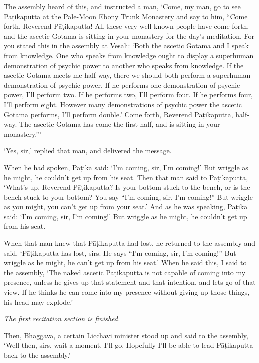\documentclass[12pt,openany]{book}%
\newcommand*{\scendsection}[1]{\begin{center}\textit{#1}\end{center}}
\begin{document}
The assembly heard of this, and instructed a man, ‘Come, my man, go to see \textsanskrit{Pāṭikaputta} at the Pale-Moon Ebony Trunk Monastery and say to him, “Come forth, Reverend \textsanskrit{Pāṭikaputta}! All these very well-known people have come forth, and the ascetic Gotama is sitting in your monastery for the day’s meditation. For you stated this in the assembly at \textsanskrit{Vesālī}: ‘Both the ascetic Gotama and I speak from knowledge. One who speaks from knowledge ought to display a superhuman demonstration of psychic power to another who speaks from knowledge. If the ascetic Gotama meets me half-way, there we should both perform a superhuman demonstration of psychic power. If he performs one demonstration of psychic power, I’ll perform two. If he performs two, I’ll perform four. If he performs four, I’ll perform eight. However many demonstrations of psychic power the ascetic Gotama performs, I’ll perform double.’ Come forth, Reverend \textsanskrit{Pāṭikaputta}, half-way. The ascetic Gotama has come the first half, and is sitting in your monastery.”’ 

‘Yes, sir,’ replied that man, and delivered the message. 

When he had spoken, \textsanskrit{Pāṭika} said: ‘I’m coming, sir, I’m coming!’ But wriggle as he might, he couldn’t get up from his seat. Then that man said to \textsanskrit{Pāṭikaputta}, ‘What’s up, Reverend \textsanskrit{Pāṭikaputta}? Is your bottom stuck to the bench, or is the bench stuck to your bottom? You say “I’m coming, sir, I’m coming!” But wriggle as you might, you can’t get up from your seat.’ And as he was speaking, \textsanskrit{Pāṭika} said: ‘I’m coming, sir, I’m coming!’ But wriggle as he might, he couldn’t get up from his seat. 

When that man knew that \textsanskrit{Pāṭikaputta} had lost, he returned to the assembly and said, ‘\textsanskrit{Pāṭikaputta} has lost, sirs. He says “I’m coming, sir, I’m coming!” But wriggle as he might, he can’t get up from his seat.’ When he said this, I said to the assembly, ‘The naked ascetic \textsanskrit{Pāṭikaputta} is not capable of coming into my presence, unless he gives up that statement and that intention, and lets go of that view. If he thinks he can come into my presence without giving up those things, his head may explode.’ 

\scendsection{The first recitation section is finished. }

Then, Bhaggava, a certain Licchavi minister stood up and said to the assembly, ‘Well then, sirs, wait a moment, I’ll go. Hopefully I’ll be able to lead \textsanskrit{Pāṭikaputta} back to the assembly.’ 
\end{document}
